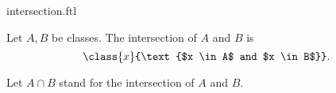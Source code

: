 \documentclass{stex}
\begin{document}
\begin{smodule}{intersection.ftl}

  \begin{forthel}
    \begin{definition}
      Let $A, B$ be classes.
      The intersection of $A$ and $B$ is
      \[\class{x}{\text{$x \in A$ and $x \in B$}}.\]
    \end{definition}

    Let $A \cap B$ stand for the intersection of $A$ and $B$.
  \end{forthel}
\end{smodule}
\end{document}
